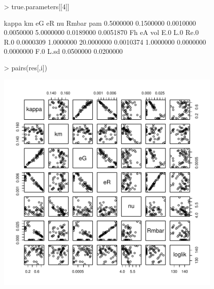 \documentclass[12pt,reqno,final]{amsart}
\theoremstyle{plain}
\numberwithin{equation}{part}
\begin{document}
\begin{figure}
\begin{Schunk}
\begin{Sinput}
> true.parameters[[4]]
\end{Sinput}
\begin{Soutput}
     kappa         km         eG         eR         nu      Rmbar        pam 
 0.5000000  0.1500000  0.0010000  0.0050000  5.0000000  0.0189000  0.0051870 
        Fh         eA        vol        E.0        L.0       Re.0        R.0 
 0.0000309  1.0000000 20.0000000  0.0010374  1.0000000  0.0000000  0.0000000 
       F.0       L.sd 
 0.0500000  0.0200000 
\end{Soutput}
\begin{Sinput}
> pairs(res[,i])
\end{Sinput}
\end{Schunk}
\includegraphics{Correlation_among_parameters-008}
\end{figure}
\end{document}
